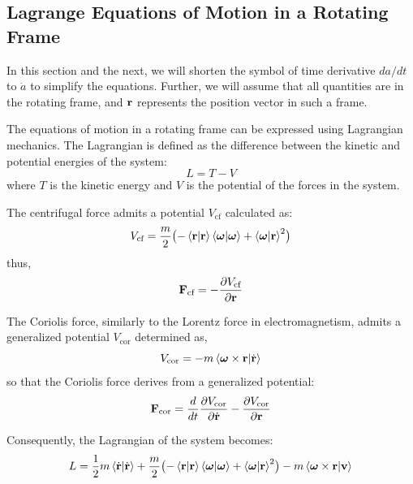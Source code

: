 \documentclass[12pt]{article}
\begin{document}
\subsection{Lagrange Equations of Motion in a Rotating Frame}

In this section and the next, we will shorten the symbol of time derivative $da/dt$ to
$\dot{a}$ to simplify the equations. Further, we will assume that all quantities are in the
rotating frame, and $\vb{r}$ represents the position vector in such a frame.

The equations of motion in a rotating frame can be expressed using Lagrangian mechanics. The
Lagrangian is defined as the difference between the kinetic and potential energies of the
system:
\begin{equation}
  L = T - V
\end{equation}
where $T$ is the kinetic energy and $V$ is the potential of the forces in the system.

The centrifugal force admits a potential $V_\text{cf}$ calculated as:
\begin{equation}
  V_\text{cf} = \frac{m}{2}\bigl(-\ip{\vb{r}}{\vb{r}}\ip{\boldsymbol{\omega}}{\boldsymbol{\omega}}
    + \ip{\boldsymbol{\omega}}{\vb{r}}^2\bigr)
\end{equation}
thus,
\begin{equation}
  \vb{F}_\text{cf} = -\frac{\partial V_\text{cf}}{\partial\vb{r}}
\end{equation}

The Coriolis force, similarly to the Lorentz force in electromagnetism, admits a generalized
potential $V_\text{cor}$ determined as,
\begin{equation}
  V_\text{cor} = -m\ip{\boldsymbol{\omega}\times\vb{r}}{\dot{\vb{r}}}
\end{equation}
so that the Coriolis force derives from a generalized potential:
\begin{equation}
  \vb{F}_\text{cor} = \frac{d}{dt}\frac{\partial V_\text{cor}}{\partial\dot{\vb{r}}}
    - \frac{\partial V_\text{cor}}{\partial\vb{r}}
\end{equation}

Consequently, the Lagrangian of the system becomes:
\begin{equation}
  L = \frac{1}{2}m\ip{\dot{\vb{r}}}{\dot{\vb{r}}}
    + \frac{m}{2}\bigl(-\ip{\vb{r}}{\vb{r}}\ip{\boldsymbol{\omega}}{\boldsymbol{\omega}}
      + \ip{\boldsymbol{\omega}}{\vb{r}}^2\bigr)
    - m\ip{\boldsymbol{\omega}\times\vb{r}}{\vb{v}}
\end{equation}
\end{document}
